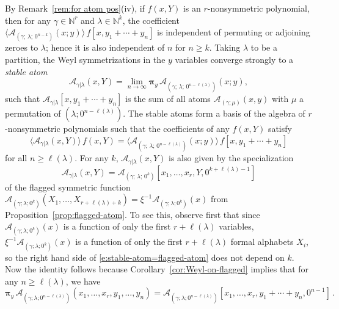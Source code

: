 \documentclass[12pt]{amsart}
\theoremstyle{definition}
\theoremstyle{remark}
\newcommand{\NN}{{\mathbb N}}
\newcommand{\pibold}{{\boldsymbol \pi }}
\newcommand{\Weyl}{\pibold }
\newcommand{\Acal}{{\mathcal A}}
\begin{document}
By Remark~\ref{rem:for atom pos}(iv), if $f(x,Y)$ is an
$r$-nonsymmetric polynomial, then for any $\gamma \in \NN ^{r}$ and
$\lambda \in \NN ^{k}$, the coefficient $\langle \Acal_{(\gamma ;\,
\lambda ;\, 0^{n-k})}(x;y) \rangle\, f[x,y_{1}+\cdots +y_{n}]$ is
independent of permuting or adjoining zeroes to $\lambda $; hence it
is also independent of $n$ for $n\geq k$.  Taking $\lambda $ to be a
partition, the Weyl symmetrizations in the $y$ variables converge
strongly to a {\em stable atom}
\begin{equation}\label{e:stable-atom}
\Acal _{\gamma |\lambda }(x,Y) = \lim_{n\rightarrow \infty } \Weyl
_{y} \, \Acal_{(\gamma ;\, \lambda ;\, 0^{n-\ell (\lambda )})}(x;y),
\end{equation}
such that $\Acal _{\gamma |\lambda }[x,y_{1}+\cdots +y_{n}]$ is the
sum of all atoms $\Acal _{(\gamma ;\mu )}(x,y)$ with $\mu $ a
permutation of $(\lambda ;0^{n-\ell (\lambda )})$.  The stable atoms
form a basis of the algebra of $r$-nonsymmetric polynomials such that
the coefficients of any $f(x,Y)$ satisfy
\begin{equation}\label{e:stable-atom-coefs}
\langle \Acal _{\gamma |\lambda }(x,Y) \rangle\, f(x,Y) =
\langle \Acal_{(\gamma ;\,
\lambda ;\, 0^{n-\ell (\lambda )})}(x;y) \rangle\, f[x,y_{1}+\cdots +y_{n}]
\end{equation}
for all $n\geq \ell (\lambda )$.  For any $k$, $\Acal _{\gamma
|\lambda }(x,Y)$ is also given by the specialization
\begin{equation}\label{e:stable-atom=flagged-atom}
\Acal _{\gamma |\lambda }(x,Y) = \Acal _{(\gamma ;\, \lambda;\, 0^{k}
)}[x_{1},\ldots,x_{r},Y,0^{k+\ell (\lambda )-1}]
\end{equation}
of the flagged symmetric function $\Acal _{(\gamma ;\lambda ;0^{k}
)}(X_{1},\ldots,X_{r+\ell (\lambda )+k}) = \xi ^{-1} \Acal _{(\gamma
;\lambda ;0^{k} )}(x)$ from Proposition~\ref{prop:flagged-atom}.  To
see this, observe first that since $\Acal _{(\gamma ;\lambda ;0^{k}
)}(x)$ is a function of only the first $r+\ell (\lambda )$ variables,
$\xi ^{-1} \Acal _{(\gamma ;\lambda ;0^{k} )}(x)$ is a function of
only the first $r+\ell (\lambda )$ formal alphabets $X_{i}$, so the
right hand side of \eqref{e:stable-atom=flagged-atom} does not depend
on $k$.  Now the identity follows because
Corollary~\ref{cor:Weyl-on-flagged} implies that for any $n\geq \ell
(\lambda )$, we have
\begin{equation}\label{e:stable-atom-flagged-1}
\Weyl _{y}\, \Acal _{(\gamma ;\lambda ;0^{n-\ell (\lambda
)})}(x_{1},\ldots,x_{r}, y_{1},\ldots, y_{n}) = \Acal _{(\gamma
;\lambda ;0^{n-\ell (\lambda )})}[x_{1},\ldots,x_{r}, y_{1}+\cdots
+y_{n},0^{n-1}]\, .
\end{equation}
\end{document}
